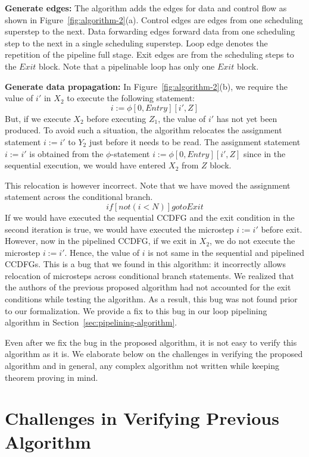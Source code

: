 {\bf Generate edges:} The algorithm adds the edges for data and control flow as shown in Figure~\ref{fig:algorithm-2}(a). Control edges are edges from one scheduling superstep to the next. Data forwarding edges forward data from one scheduling step to the next in a single scheduling superstep. Loop edge denotes the repetition of the pipeline full stage. Exit edges are from the scheduling steps to the $Exit$ block. Note that a pipelinable loop has only one $Exit$ block.

{\bf Generate data propagation:} In Figure~\ref{fig:algorithm-2}(b), we require the value of $i'$ in $X_2$ to execute the following statement:
$$ i := \phi [0, Entry][i', Z]$$
But, if we execute $X_2$ before executing $Z_1$, the value of $i'$ has not yet been produced. To avoid such a situation, the algorithm relocates the assignment statement $i := i'$ to $Y_2$ just before it needs to be read. The assignment statement $i := i'$ is obtained from the $\phi$-statement $i := \phi [0, Entry][i', Z]$ since in the sequential execution, we would have entered $X_2$ from $Z$ block.

This relocation is however incorrect. Note that we have moved the assignment statement across the conditional branch. $$ if [not (i<N)] goto Exit $$ If we would have executed the sequential CCDFG and the exit condition in the second iteration is true, we would have executed the microstep $i := i'$ before exit. However, now in the pipelined CCDFG, if we exit in $X_2$, we do not execute the microstep $i := i'$. Hence, the value of $i$ is not same in the sequential and pipelined CCDFGs. This is a bug that we found in this algorithm: it incorrectly allows relocation of microsteps across conditional branch statements.
We realized that the authors of the previous proposed algorithm had not accounted for the exit conditions while testing the algorithm. As a result, this bug was not found prior to our formalization. We provide a fix to this bug in our loop pipelining algorithm in Section~\ref{sec:pipelining-algorithm}.

Even after we fix the bug in the proposed algorithm, it is not easy to verify this algorithm as it is.
We elaborate below on the challenges
in verifying the proposed algorithm and in general, any complex algorithm not written while keeping theorem proving in mind.

\section{Challenges in Verifying Previous Algorithm}

